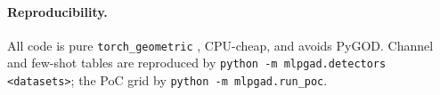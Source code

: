 \documentclass[11pt]{article}
\begin{document}
\paragraph{Reproducibility.} All code is pure \texttt{torch\_geometric} \citep{fey2019pyg},
CPU-cheap, and avoids PyGOD. Channel and few-shot tables are reproduced by
\texttt{python -m mlpgad.detectors <datasets>}; the PoC grid by \texttt{python -m mlpgad.run\_poc}.



\end{document}
